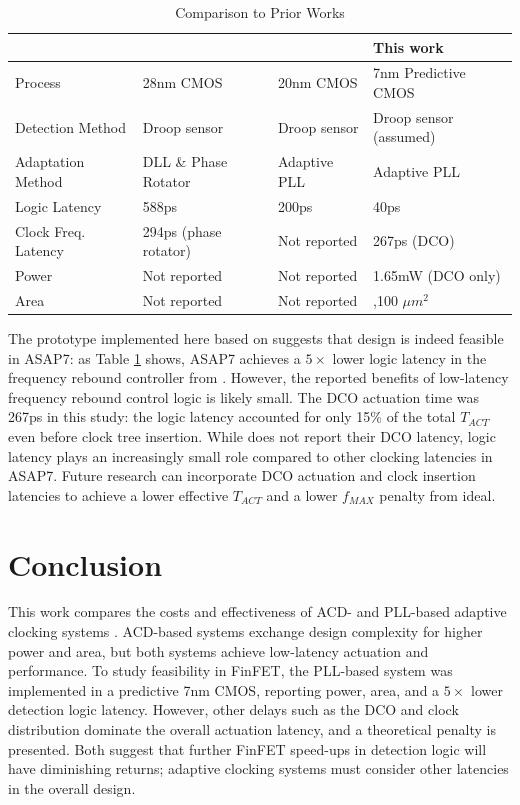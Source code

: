 \documentclass[twoside,9pt,journal,letterpage]{IEEEtran}
\begin{document}
\begin{table}[!ht]
\caption{Comparison to Prior Works} 
\label{table:comparison}
\centering
\begin{tabularx}{\columnwidth}{
	| >{\centering\arraybackslash}X 
	| >{\centering\arraybackslash}X 
	| >{\centering\arraybackslash}X 
	| >{\centering\arraybackslash}X | }
	\hline
	& \cite{wilcox2015} & \cite{hashimoto2018} & This work \\
	\hline
	Process & 28nm CMOS & 20nm CMOS & 7nm Predictive CMOS  \\
	\hline
	Detection Method & Droop sensor & Droop sensor & Droop sensor (assumed)  \\
	\hline
	Adaptation Method & DLL \& Phase Rotator & Adaptive PLL & Adaptive PLL  \\
	\hline
	Logic Latency & 588ps & 200ps & 40ps  \\
	\hline
	Clock Freq. Latency & 294ps (phase rotator) & Not reported & 267ps (DCO)  \\
	\hline
	Power & Not reported & Not reported & 1.65mW (DCO only) \\
	\hline
	Area & Not reported & Not reported & 10,100 $\mu m^2$ \\
	\hline
\end{tabularx}
\end{table}

The prototype implemented here based on \cite{hashimoto2018} suggests that design is indeed feasible in ASAP7: as Table \ref{table:comparison} shows, ASAP7 achieves a $5\times$ lower logic latency in the frequency rebound controller from \cite{hashimoto2018}. However, the reported benefits of low-latency frequency rebound control logic is likely small. The DCO actuation time was 267ps in this study: the logic latency accounted for only 15\% of the total $T_{ACT}$ even before clock tree insertion. While \cite{hashimoto2018} does not report their DCO latency, logic latency plays an increasingly small role compared to other clocking latencies in ASAP7. Future research can incorporate DCO actuation and clock insertion latencies to achieve a lower effective $T_{ACT}$ and a lower $f_{MAX}$ penalty from ideal.

\vspace{-5pt}
\section{Conclusion}
\label{sec:conclusion}

This work compares the costs and effectiveness of ACD- and PLL-based adaptive clocking systems \cite{hashimoto2018,wilcox2015}. ACD-based systems exchange design complexity for higher power and area, but both systems achieve low-latency actuation and performance. To study feasibility in FinFET, the PLL-based system was implemented in a predictive 7nm CMOS, reporting power, area, and a $5\times$ lower detection logic latency. However, other delays such as the DCO and clock distribution dominate the overall actuation latency, and a theoretical penalty is presented. Both suggest that further FinFET speed-ups in detection logic will have diminishing returns; adaptive clocking systems must consider other latencies in the overall design. 

\vspace{-5pt}

\begingroup
\raggedright

\endgroup
\end{document}
